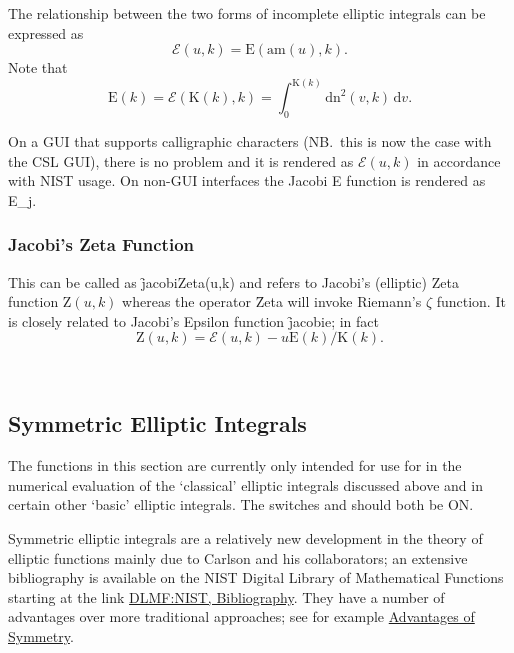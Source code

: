 The relationship between the two forms of incomplete elliptic integrals can
be expressed as
\[\mathcal{E}(u, k) = \mathrm{E}(\mathrm{am}(u), k).\]
Note that
\[\mathrm{E}(k)=\mathcal{E}(\mathrm{K}(k), k)
=\int_0^{\mathrm{K}(k)} \mathrm{dn}^2(v, k) \,\mathrm{d}v.\]

On a GUI that supports calligraphic characters (NB.\ this is now the case with the
CSL GUI), there is no problem and it is rendered as $\mathcal{E}(u,k)$
in accordance with NIST usage.
On non-GUI interfaces the Jacobi E function is rendered as E\_j.

\subsubsection{Jacobi's Zeta Function}
\hypertarget{operator:JACOBIZETA}{}

This can be called as \f{jacobiZeta(u,k)} and refers to Jacobi's (elliptic)
Zeta function $\mathrm{Z}(u,k)$ whereas the operator \f{Zeta} will invoke
Riemann's $\zeta$ function. It is closely related to Jacobi's Epsilon function
\f{jacobie}; in fact
\[\mathrm{Z}(u,k) = \mathcal{E}(u,k)-u\mathrm{E}(k)/\mathrm{K}(k).\]

\
\subsection{Symmetric Elliptic Integrals}
The functions in this section are currently only intended for use for in the
numerical evaluation of the `classical' elliptic integrals discussed above and
in certain other `basic' elliptic integrals. The switches \sw{ROUNDED} and
\sw{COMPLEX} should both be ON.

Symmetric elliptic integrals are a relatively new development in the theory of
elliptic functions mainly due to Carlson and his collaborators; an extensive
bibliography is available on the NIST Digital Library of Mathematical Functions
starting at the link \href{https://dlmf.nist.gov/bib/C#bib449}
{DLMF:NIST, Bibliography}. They have a number of advantages over more
traditional approaches; see for example
\href{https://dlmf.nist.gov/19.15}{Advantages of Symmetry}.

